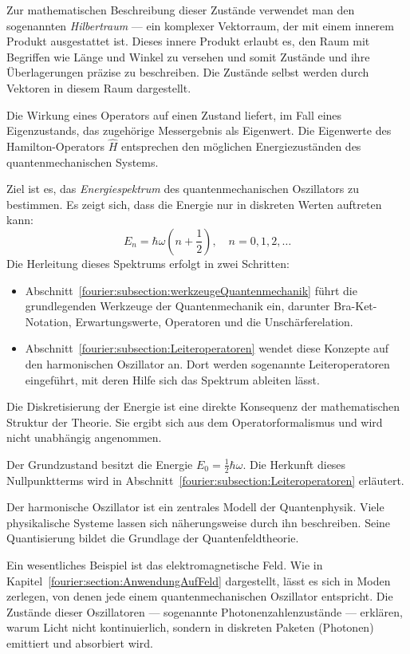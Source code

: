 	Zur mathematischen Beschreibung dieser Zustände verwendet man den sogenannten \emph{Hilbertraum} --- ein komplexer Vektorraum, der mit einem innerem Produkt ausgestattet ist.
	Dieses innere Produkt erlaubt es, den Raum mit Begriffen wie Länge und Winkel zu versehen und somit Zustände und ihre Überlagerungen präzise zu beschreiben.
	Die Zustände selbst werden durch Vektoren in diesem Raum dargestellt.

	Die Wirkung eines Operators auf einen Zustand liefert, im Fall eines Eigenzustands, das zugehörige Messergebnis als Eigenwert.
	Die Eigenwerte des Hamilton-Operators $\hat{H}$ entsprechen den möglichen Energiezuständen des quantenmechanischen Systems.

	Ziel ist es, das \emph{Energiespektrum} des quantenmechanischen Oszillators zu bestimmen.
	Es zeigt sich, dass die Energie nur in diskreten Werten auftreten kann:
	\[
	E_n = \hbar \omega \left(n + \frac{1}{2} \right), \quad n = 0, 1, 2, \dots
	\]
	Die Herleitung dieses Spektrums erfolgt in zwei Schritten:
	\begin{itemize}
		\item Abschnitt~\ref{fourier:subsection:werkzeugeQuantenmechanik} führt die grundlegenden Werkzeuge der Quantenmechanik ein,
		darunter Bra-Ket-Notation, Erwartungswerte, Operatoren und die Unschärferelation.
		\item Abschnitt~\ref{fourier:subsection:Leiteroperatoren} wendet diese Konzepte auf den harmonischen Oszillator an.
		Dort werden sogenannte Leiteroperatoren eingeführt, mit deren Hilfe sich das Spektrum ableiten lässt.
	\end{itemize}
	Die Diskretisierung der Energie ist eine direkte Konsequenz der mathematischen Struktur der Theorie.
	Sie ergibt sich aus dem Operatorformalismus und wird nicht unabhängig angenommen.


	Der Grundzustand besitzt die Energie $E_0 = \frac{1}{2}\hbar \omega$.
	Die Herkunft dieses Nullpunktterms wird in Abschnitt~\ref{fourier:subsection:Leiteroperatoren} erläutert.

	Der harmonische Oszillator ist ein zentrales Modell der Quantenphysik.
	Viele physikalische Systeme lassen sich näherungsweise durch ihn beschreiben.
	Seine Quantisierung bildet die Grundlage der Quantenfeldtheorie.

	Ein wesentliches Beispiel ist das elektromagnetische Feld.
	Wie in Kapitel~\ref{fourier:section:AnwendungAufFeld} dargestellt, lässt es sich in Moden zerlegen, von denen jede einem quantenmechanischen Oszillator entspricht.
	Die Zustände dieser Oszillatoren --- sogenannte Photonenzahlenzustände ---
	erklären, warum Licht nicht kontinuierlich, sondern in diskreten Paketen (Photonen) emittiert und absorbiert wird.
	
